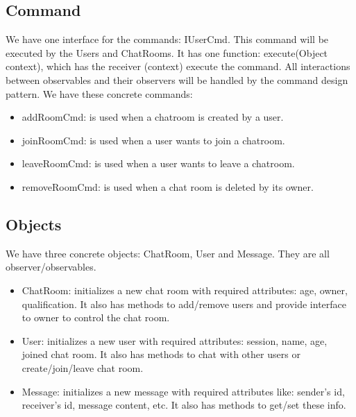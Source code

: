 \documentclass[letterpaper, 11pt]{article}
\begin{document}
\subsection{Command}
We have one interface for the commands: IUserCmd. This command will be executed by the Users and ChatRooms. It has one function: execute(Object context), which has the receiver (context) execute the command. All interactions between observables and their observers will be handled by the command design pattern. We have these concrete commands:
\begin{itemize}
\item addRoomCmd: is used when a chatroom is created by a user.
\item joinRoomCmd: is used when a user wants to join a chatroom.
\item leaveRoomCmd: is used when a user wants to leave a chatroom.
\item removeRoomCmd: is used when a chat room is deleted by its owner.
\end{itemize}


\subsection{Objects}
We have three concrete objects: ChatRoom, User and Message. They are all observer/observables. 
\begin{itemize}
\item ChatRoom: initializes a new chat room with required attributes: age, owner, qualification. It also has methods to add/remove users and provide interface to owner to control the chat room.
\item User: initializes a new user with required attributes: session, name, age, joined chat room. It also has methods to chat with other users or create/join/leave chat room.
\item Message: initializes a new message with required attributes like: sender's id, receiver's id, message content, etc. It also has methods to get/set these info.
\end{itemize}
\end{document}
